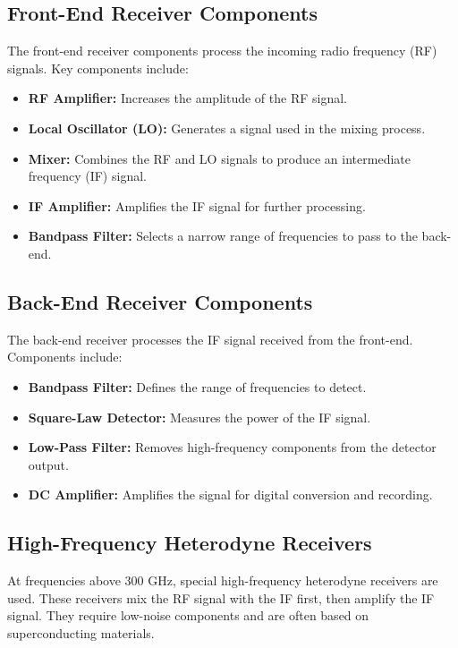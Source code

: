 \subsection{Front-End Receiver Components}

The front-end receiver components process the incoming radio frequency (RF) signals. Key components include:

\begin{itemize}
    \item \textbf{RF Amplifier:} Increases the amplitude of the RF signal.
    \item \textbf{Local Oscillator (LO):} Generates a signal used in the mixing process.
    \item \textbf{Mixer:} Combines the RF and LO signals to produce an intermediate frequency (IF) signal.
    \item \textbf{IF Amplifier:} Amplifies the IF signal for further processing.
    \item \textbf{Bandpass Filter:} Selects a narrow range of frequencies to pass to the back-end.
\end{itemize}

\subsection{Back-End Receiver Components}

The back-end receiver processes the IF signal received from the front-end. Components include:

\begin{itemize}
    \item \textbf{Bandpass Filter:} Defines the range of frequencies to detect.
    \item \textbf{Square-Law Detector:} Measures the power of the IF signal.
    \item \textbf{Low-Pass Filter:} Removes high-frequency components from the detector output.
    \item \textbf{DC Amplifier:} Amplifies the signal for digital conversion and recording.
\end{itemize}

\subsection{High-Frequency Heterodyne Receivers}

At frequencies above 300 GHz, special high-frequency heterodyne receivers are used. These receivers mix the RF signal with the IF first, then amplify the IF signal. They require low-noise components and are often based on superconducting materials.

